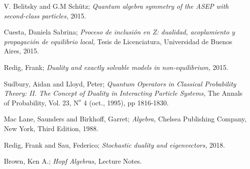 \documentclass[twoside,openright,titlepage,numbers=noenddot,headinclude,  lineheaders footinclude=true,cleardoublepage=empty,
                                BCOR=5mm,paper=a4,fontsize=12pt ]{scrbook}
\theoremstyle{definition}
\begin{document}
\begin{thebibliography}{9999}
V. Belitsky and G.M Sch{\"u}tz;
\emph{Quantum algebra symmetry of the ASEP with second-class particles, }  2015.

Cuesta, Daniela Sabrina;
\emph{Proceso de inclusión en Z: dualidad,
acoplamiento y propagación de equilibrio local, } Tesis de Licenciatura, Universidad de Buenos Aires,  2015.

Redig, Frank;
\emph{Duality and exactly solvable models in
non-equilibrium, } 2015.

Sudbury, Aidan and  Lloyd, Peter;
\emph{Quantum Operators in Classical Probability Theory: II. 
The Concept of Duality in Interacting Particle Systems, } The Annals of Probability,
Vol. 23, $\text{N}^o$ 4 (oct., 1995), pp 1816-1830.

Mac Lane, Saunders and Birkhoff, Garret;
\emph{Algebra, }Chelsea Publishing Company, New York, Third Edition, 1988.

Redig, Frank and Sau, Federico;
\emph{Stochastic duality and eigenvectors,} 2018.

Brown, Ken A.;
\emph{Hopf Algebras, }Lecture Notes.



\end{thebibliography}


\clearpage
{}
{}
\end{document}
